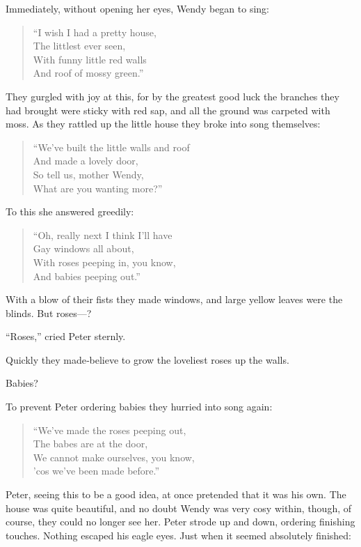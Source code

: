 Immediately, without opening her eyes, Wendy began to sing:

\begin{verse}
	“I wish I had a pretty house,\\
	The littlest ever seen,\\
	With funny little red walls\\
	And roof of mossy green.”
\end{verse}

They gurgled with joy at this,
for by the greatest good luck the branches they had brought were sticky with red sap,
and all the ground was carpeted with moss.
As they rattled up the little house they broke into song themselves:

\begin{verse}
	“We’ve built the little walls and roof\\
	And made a lovely door,\\
	So tell us, mother Wendy,\\
	What are you wanting more?”
\end{verse}

To this she answered greedily:

\begin{verse}
	“Oh, really next I think I’ll have\\
	Gay windows all about,\\
	With roses peeping in, you know,\\
	And babies peeping out.”
\end{verse}

With a blow of their fists they made windows,
and large yellow leaves were the blinds.
But roses—?

“Roses,” cried Peter sternly.

Quickly they made‐believe to grow the loveliest roses up the walls.

Babies?

To prevent Peter ordering babies they hurried into song again:

\begin{verse}
	“We’ve made the roses peeping out,\\
	The babes are at the door,\\
	We cannot make ourselves, you know,\\
	’cos we’ve been made before.”
\end{verse}

Peter, seeing this to be a good idea, at once pretended that it was his own.
The house was quite beautiful, and no doubt Wendy was very cosy within,
though, of course, they could no longer see her.
Peter strode up and down, ordering finishing touches.
Nothing escaped his eagle eyes.
Just when it seemed absolutely finished:

